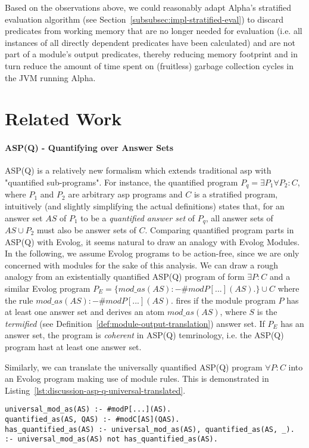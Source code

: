 Based on the observations above, we could reasonably adapt Alpha's stratified evaluation algorithm (see Section~\ref{subsubsec:impl-stratified-eval}) to discard predicates from working memory that are no longer needed for evaluation (i.e. all instances of all directly dependent predicates have been calculated) and are not part of a module's output predicates, thereby reducing memory footprint and in turn reduce the amount of time spent on (fruitless) garbage collection cycles in the JVM running Alpha.

\section{Related Work}

\paragraph{ASP(Q) - Quantifying over Answer Sets~\cite{asp-q}}
ASP(Q) is a relatively new formalism which extends traditional \gls{asp} with "quantified sub-programs". For instance, the quantified program $P_q = \exists P_1 \forall P_2 : C$, where $P_1$ and $P_2$ are arbitrary \gls{asp} programs and $C$ is a stratified program, intuitively (and slightly simplifying the actual definitions) states that, for an answer set $AS$ of $P_1$ to be a \emph{quantified answer set} of $P_q$, all answer sets of $AS \cup P_2$ must also be answer sets of $C$. Comparing quantified program parts in ASP(Q) with Evolog, it seems natural to draw an analogy with Evolog Modules. In the following, we assume Evolog programs to be action-free, since we are only concerned with modules for the sake of this analysis. We can draw a rough analogy from an existentially quantified ASP(Q) program of form $\exists P : C$ and a similar Evolog program $P_E = \{mod\_as(AS) :- \#modP[...](AS).\} \cup C$ where the rule $mod\_as(AS) :- \#modP[...](AS).$ fires if the module program $P$ has at least one answer set and derives an atom $mod\_as(AS)$, where $S$ is the \emph{termified} (see Definition~\ref{def:module-output-translation}) answer set. If $P_E$ has an answer set, the program is \emph{coherent} in ASP(Q) temrinology, i.e. the ASP(Q) program hast at least one answer set.

Similarly, we can translate the universally quantified ASP(Q) program $\forall P : C$ into an Evolog program making use of module rules. This is demonstrated in Listing~\ref{lst:discussion-asp-q-universal-translated}.
\begin{lstlisting}[style=asp-code, label={lst:discussion-asp-q-universal-translated}, caption={Prototypical translation of a universally quantified ASP(Q) program.}]
universal_mod_as(AS) :- #modP[...](AS).
quantified_as(AS, QAS) :- #modC[AS](QAS).
has_quantified_as(AS) :- universal_mod_as(AS), quantified_as(AS, _).
:- universal_mod_as(AS) not has_quantified_as(AS). 
\end{lstlisting}	

